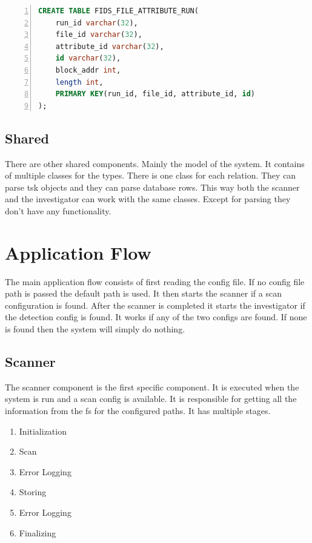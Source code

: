 \documentclass[
	a4paper,					%
	10pt,							%
	twoside,					%
	openright,				%
	notitlepage,			%
	parskip=half,			%
]{scrreprt}					%
\begin{document}
\begin{lstlisting}[language=sql, numbers=left, caption=Fids File Attribute Run Table Definition, label=lst:cfg:fids:file:attr:run]
CREATE TABLE FIDS_FILE_ATTRIBUTE_RUN(
	run_id varchar(32),
	file_id varchar(32),
	attribute_id varchar(32), 
	id varchar(32), 
	block_addr int, 
	length int, 
	PRIMARY KEY(run_id, file_id, attribute_id, id) 
);
\end{lstlisting}

\subsection{Shared}

There are other shared components. Mainly the model of the system. It contains of multiple classes for the types. There is one class for each relation. They can parse \gls{tsk} objects and they can parse database rows. This way both the scanner and the investigator can work with the same classes. Except for parsing they don't have any functionality.


\section{Application Flow}
\label{sec:flow}

The main application flow consists of first reading the config file. If no config file path is passed the default path is used. It then starts the scanner if a scan configuration is found. After the scanner is completed it starts the investigator if the detection config is found. It works if any of the two configs are found. If none is found then the system will simply do nothing. 


\subsection{Scanner}
\label{sec:Scanner}

The scanner component is the first specific component. It is executed when the system is run and a scan config is available. It is responsible for getting all the information from the \gls{fs} for the configured paths. It has multiple stages.

\begin{enumerate}
	\item Initialization
	\item Scan
	\item Error Logging
	\item Storing
	\item Error Logging
	\item Finalizing
\end{enumerate}
\end{document}
